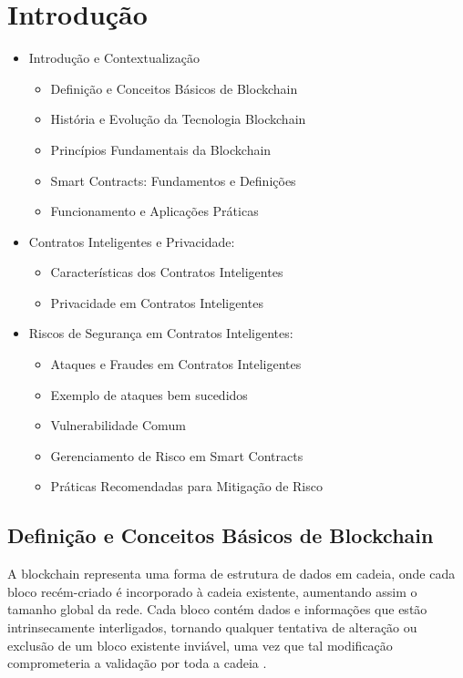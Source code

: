 
\chapter{Introdução}
\label{chap:intro}


\begin{itemize}
\item Introdução e Contextualização
	\begin{itemize}
 \item             Definição e Conceitos Básicos de Blockchain 
          \item História e Evolução da Tecnologia Blockchain
	   \item Princípios Fundamentais da Blockchain 
	   \item Smart Contracts: Fundamentos e Definições
	   \item Funcionamento e Aplicações Práticas

        \end{itemize}
\item Contratos Inteligentes e Privacidade: 
	\begin{itemize}
            \item Características dos Contratos Inteligentes
     \item Privacidade em Contratos Inteligentes 
        \end{itemize}
\item Riscos de Segurança em Contratos Inteligentes:
	\begin{itemize}	
            \item Ataques e Fraudes em Contratos Inteligentes
	    \item Exemplo de ataques bem sucedidos
     \item Vulnerabilidade Comum
     \item Gerenciamento de Risco em Smart Contracts
     \item Práticas Recomendadas para Mitigação de Risco

	\end{itemize}

\end{itemize}



\section{\label{sec:secao1}Definição e Conceitos Básicos de Blockchain}
A blockchain representa uma forma de estrutura de dados em cadeia, onde cada bloco recém-criado é incorporado à cadeia existente, aumentando assim o tamanho global da rede. Cada bloco contém dados e informações que estão intrinsecamente interligados, tornando qualquer tentativa de alteração ou exclusão de um bloco existente inviável, uma vez que tal modificação comprometeria a validação por toda a cadeia \cite{exame}.

